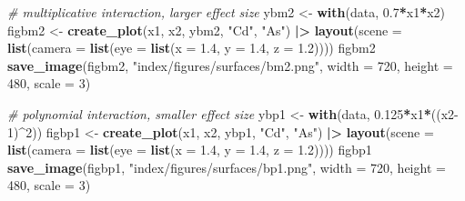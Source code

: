 \documentclass[12pt, twoside]{amherstthesis}
\newenvironment{Shaded}{\begin{snugshade}}{\end{snugshade}}
\newcommand{\AttributeTok}[1]{\textcolor[rgb]{0.13,0.29,0.53}{#1}}
\newcommand{\CommentTok}[1]{\textcolor[rgb]{0.56,0.35,0.01}{\textit{#1}}}
\newcommand{\DecValTok}[1]{\textcolor[rgb]{0.00,0.00,0.81}{#1}}
\newcommand{\FloatTok}[1]{\textcolor[rgb]{0.00,0.00,0.81}{#1}}
\newcommand{\FunctionTok}[1]{\textcolor[rgb]{0.13,0.29,0.53}{\textbf{#1}}}
\newcommand{\NormalTok}[1]{#1}
\newcommand{\OtherTok}[1]{\textcolor[rgb]{0.56,0.35,0.01}{#1}}
\newcommand{\SpecialCharTok}[1]{\textcolor[rgb]{0.81,0.36,0.00}{\textbf{#1}}}
\newcommand{\StringTok}[1]{\textcolor[rgb]{0.31,0.60,0.02}{#1}}
\begin{document}
\begin{Shaded}
\begin{Highlighting}[]
\CommentTok{\# multiplicative interaction, larger effect size}
\NormalTok{ybm2 }\OtherTok{\textless{}{-}} \FunctionTok{with}\NormalTok{(data, }\FloatTok{0.7}\SpecialCharTok{*}\NormalTok{x1}\SpecialCharTok{*}\NormalTok{x2) }
\NormalTok{figbm2 }\OtherTok{\textless{}{-}} \FunctionTok{create\_plot}\NormalTok{(x1, x2, ybm2, }\StringTok{"Cd"}\NormalTok{, }\StringTok{"As"}\NormalTok{) }\SpecialCharTok{|\textgreater{}} 
  \FunctionTok{layout}\NormalTok{(}\AttributeTok{scene =} \FunctionTok{list}\NormalTok{(}\AttributeTok{camera =} \FunctionTok{list}\NormalTok{(}\AttributeTok{eye =} \FunctionTok{list}\NormalTok{(}\AttributeTok{x =} \FloatTok{1.4}\NormalTok{, }\AttributeTok{y =} \FloatTok{1.4}\NormalTok{, }\AttributeTok{z =} \FloatTok{1.2}\NormalTok{))))}
\NormalTok{figbm2}
\FunctionTok{save\_image}\NormalTok{(figbm2, }\StringTok{"index/figures/surfaces/bm2.png"}\NormalTok{, }
           \AttributeTok{width =} \DecValTok{720}\NormalTok{, }\AttributeTok{height =} \DecValTok{480}\NormalTok{, }\AttributeTok{scale =} \DecValTok{3}\NormalTok{)}

\CommentTok{\# polynomial interaction, smaller effect size}
\NormalTok{ybp1 }\OtherTok{\textless{}{-}} \FunctionTok{with}\NormalTok{(data, }\FloatTok{0.125}\SpecialCharTok{*}\NormalTok{x1}\SpecialCharTok{*}\NormalTok{((x2}\DecValTok{{-}1}\NormalTok{)}\SpecialCharTok{\^{}}\DecValTok{2}\NormalTok{)) }
\NormalTok{figbp1 }\OtherTok{\textless{}{-}} \FunctionTok{create\_plot}\NormalTok{(x1, x2, ybp1, }\StringTok{"Cd"}\NormalTok{, }\StringTok{"As"}\NormalTok{) }\SpecialCharTok{|\textgreater{}} 
  \FunctionTok{layout}\NormalTok{(}\AttributeTok{scene =} \FunctionTok{list}\NormalTok{(}\AttributeTok{camera =} \FunctionTok{list}\NormalTok{(}\AttributeTok{eye =} \FunctionTok{list}\NormalTok{(}\AttributeTok{x =} \FloatTok{1.4}\NormalTok{, }\AttributeTok{y =} \FloatTok{1.4}\NormalTok{, }\AttributeTok{z =} \FloatTok{1.2}\NormalTok{))))}
\NormalTok{figbp1}
\FunctionTok{save\_image}\NormalTok{(figbp1, }\StringTok{"index/figures/surfaces/bp1.png"}\NormalTok{, }
           \AttributeTok{width =} \DecValTok{720}\NormalTok{, }\AttributeTok{height =} \DecValTok{480}\NormalTok{, }\AttributeTok{scale =} \DecValTok{3}\NormalTok{)}


\end{Highlighting}
\end{Shaded}
\end{document}
